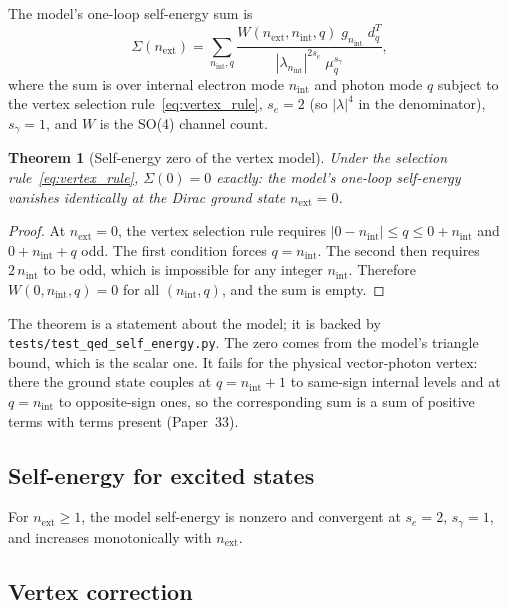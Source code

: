 \documentclass[11pt]{article}
\newtheorem{theorem}{Theorem}
\begin{document}
The model's one-loop self-energy sum is
\begin{equation}
  \Sigma(n_{\mathrm{ext}}) = \sum_{n_{\mathrm{int}}, q}
    \frac{W(n_{\mathrm{ext}}, n_{\mathrm{int}}, q) \;
          g_{n_{\mathrm{int}}} \; d_q^T}
         {|\lambda_{n_{\mathrm{int}}}|^{2s_e} \; \mu_q^{s_\gamma}},
  \label{eq:self_energy}
\end{equation}
where the sum is over internal electron mode $n_{\mathrm{int}}$ and
photon mode $q$ subject to the vertex selection
rule~\eqref{eq:vertex_rule}, $s_e = 2$ (so $|\lambda|^4$ in the
denominator), $s_\gamma = 1$, and $W$ is the SO(4) channel count.

\begin{theorem}[Self-energy zero of the vertex model]
\label{thm:self_energy_zero}
Under the selection rule~\eqref{eq:vertex_rule}, $\Sigma(0) = 0$
exactly: the model's one-loop self-energy vanishes identically at the
Dirac ground state $n_{\mathrm{ext}} = 0$.
\end{theorem}

\begin{proof}
At $n_{\mathrm{ext}} = 0$, the vertex selection rule requires
$|0 - n_{\mathrm{int}}| \le q \le 0 + n_{\mathrm{int}}$ and
$0 + n_{\mathrm{int}} + q$ odd.  The first condition forces
$q = n_{\mathrm{int}}$.  The second then requires
$2\,n_{\mathrm{int}}$ to be odd, which is impossible for any
integer $n_{\mathrm{int}}$.  Therefore $W(0, n_{\mathrm{int}}, q) = 0$
for all $(n_{\mathrm{int}}, q)$, and the sum is empty.
\end{proof}

\noindent The theorem is a statement about the model; it is backed by
\texttt{tests/test\_qed\_self\_energy.py}.  The zero comes from the
model's triangle bound, which is the scalar one.  It fails for the
physical vector-photon vertex: there the ground state couples at
$q = n_{\mathrm{int}} + 1$ to same-sign internal levels and at
$q = n_{\mathrm{int}}$ to opposite-sign ones, so the corresponding sum
is a sum of positive terms with terms present (Paper~33).

\subsection{Self-energy for excited states}

For $n_{\mathrm{ext}} \ge 1$, the model self-energy is nonzero and
convergent at $s_e = 2$, $s_\gamma = 1$, and increases monotonically
with $n_{\mathrm{ext}}$.

\subsection{Vertex correction}
\end{document}
